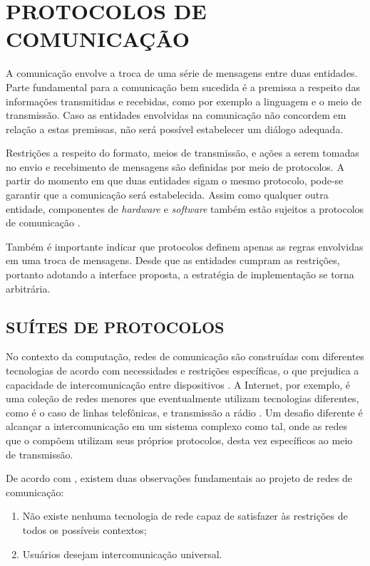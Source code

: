 \chapter{PROTOCOLOS DE COMUNICAÇÃO}

A comunicação envolve a troca de uma série de mensagens entre duas entidades. Parte
fundamental para a comunicação bem sucedida é a premissa a respeito das informações
transmitidas e recebidas, como por exemplo a linguagem e o meio de transmissão. Caso
as entidades envolvidas na comunicação não concordem em relação a estas premissas,
não será possível estabelecer um diálogo adequada.

Restrições a respeito do formato, meios de transmissão, e ações a serem tomadas no
envio e recebimento de mensagens são definidas por meio de protocolos. A partir do
momento em que duas entidades sigam o mesmo protocolo, pode-se garantir que a
comunicação será estabelecida. Assim como qualquer outra entidade, componentes de
\textit{hardware} e \textit{software} também estão sujeitos a protocolos de
comunicação \cite{kurose2012}.

Também é importante indicar que protocolos definem apenas as regras envolvidas em
uma troca de mensagens. Desde que as entidades cumpram as restrições, portanto
adotando a interface proposta, a estratégia de implementação se torna arbitrária.



\section{SUÍTES DE PROTOCOLOS}

No contexto da computação, redes de comunicação são construídas com diferentes
tecnologias de acordo com necessidades e restrições específicas, o que prejudica a
capacidade de intercomunicação entre dispositivos \cite{comer2000}. A Internet, por
exemplo, é uma coleção de redes menores que eventualmente utilizam tecnologias
diferentes, como é o caso de linhas telefônicas, e transmissão a rádio
\cite{tanenbaum2010}. Um desafio diferente é alcançar a intercomunicação em um
sistema complexo como tal, onde as redes que o compõem utilizam seus próprios
protocolos, desta vez específicos ao meio de transmissão.

De acordo com \cite{comer2000}, existem duas observações fundamentais ao projeto de
redes de comunicação:

\begin{enumerate}
  \item{Não existe nenhuma tecnologia de rede capaz de satisfazer às restrições de
        todos os possíveis contextos;}
  \item{Usuários desejam intercomunicação universal.}
\end{enumerate}

